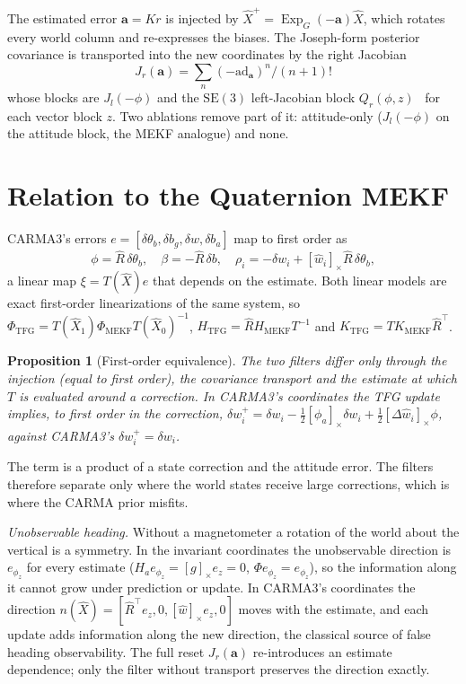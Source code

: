 \documentclass[conference]{IEEEtran}
\newcommand{\Skew}[1]{\left[#1\right]_\times}
\DeclareMathOperator{\Exp}{Exp}
\theoremstyle{bodysmall}
\newtheorem{proposition}{Proposition}
\begin{document}
The estimated error $\mathbf a=K r$ is injected by
$\hat X^{+}=\Exp_G(-\mathbf a)\hat X$, which rotates every world column and
re-expresses the biases. The Joseph-form posterior covariance is transported
into the new coordinates by the right Jacobian
\begin{equation}
J_r(\mathbf a)=\textstyle\sum_n(-\mathrm{ad}_{\mathbf a})^n/(n+1)!
\end{equation}
whose blocks are $J_l(-\phi)$ and the $\mathrm{SE}(3)$ left-Jacobian block
$Q_r(\phi,z)$~\cite{barfoot17} for each vector block $z$. Two ablations remove
part of it: attitude-only ($J_l(-\phi)$ on the attitude block, the MEKF
analogue) and none.

\section{Relation to the Quaternion MEKF}
\label{sec:equivalence}
CARMA3's errors $e=[\delta\theta_b,\delta b_g,\delta w,\delta b_a]$ map to
first order as
\begin{equation}
\phi=\hat R\,\delta\theta_b,\quad \beta=-\hat R\,\delta b,\quad
\rho_i=-\delta w_i+\Skew{\hat w_i}\hat R\,\delta\theta_b,
\end{equation}
a linear map $\xi=T(\hat X)e$ that depends on the estimate. Both linear models
are exact first-order linearizations of the same system, so
$\Phi_{\mathrm{TFG}}=T(\hat X_1)\Phi_{\mathrm{MEKF}}T(\hat X_0)^{-1}$,
$H_{\mathrm{TFG}}=\hat R H_{\mathrm{MEKF}}T^{-1}$ and
$K_{\mathrm{TFG}}=TK_{\mathrm{MEKF}}\hat R^{\top}$.

\begin{proposition}[First-order equivalence]
\label{prop:equiv}
The two filters differ only through the injection (equal to first order), the
covariance transport and the estimate at which $T$ is evaluated around a
correction. In CARMA3's coordinates the TFG update implies, to first order in
the correction,
$\delta w_i^{+}=\delta w_i-\tfrac12\Skew{\phi_a}\delta w_i
+\tfrac12\Skew{\Delta\hat w_i}\phi$, against CARMA3's
$\delta w_i^{+}=\delta w_i$.
\end{proposition}

The term is a product of a state correction and the attitude error. The
filters therefore separate only where the world states receive large
corrections, which is where the CARMA prior misfits.

\emph{Unobservable heading.} Without a magnetometer a rotation of the world
about the vertical is a symmetry. In the invariant coordinates the
unobservable direction is $e_{\phi_z}$ for every estimate
($H_ae_{\phi_z}=\Skew{g}e_z=0$, $\Phi e_{\phi_z}=e_{\phi_z}$), so the
information along it cannot grow under prediction or update. In CARMA3's
coordinates the direction $n(\hat X)=[\hat R^{\top}e_z,0,\Skew{\hat w}e_z,0]$
moves with the estimate, and each update adds information along the new
direction, the classical source of false heading
observability. The full reset $J_r(\mathbf a)$ re-introduces an estimate
dependence; only the filter without transport preserves the direction exactly.
\end{document}

